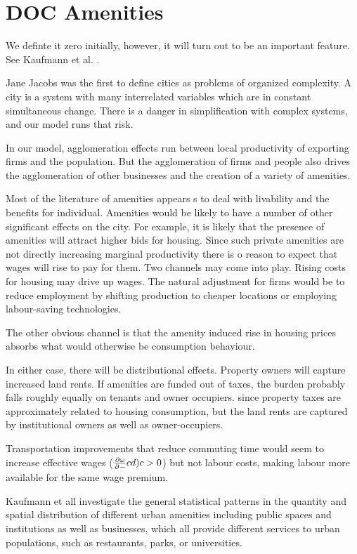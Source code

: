 \section{DOC Amenities}
We definte it zero initially, however, it will turn out to be an important feature. See Kaufmann et al. \cite{kaufmannScalingUrbanAmenities2022}.


Jane Jacobs was the first to define cities as problems of organized complexity. A city is a system with many interrelated variables which are  in constant simultaneous change. 
There is a danger in simplification with complex systems, and our model runs that risk. 

In our model, agglomeration effects run between local productivity  of exporting firms and the population. But the agglomeration of firms and people also drives the agglomeration of other businesses and the creation of a variety of amenities.

Most of the literature of amenities appears s to deal with livability  and the benefits for individual. Amenities would be likely to have a number of other significant effects on the city. For example, it is likely that the presence of amenities will attract higher bids for housing. Since such private amenities are not directly increasing marginal productivity there is o reason to expect that wages will rise to pay for them. Two channels may come into play. Rising costs for housing may drive up wages. The natural adjustment for firms would be to reduce employment by shifting production to cheaper locations or  employing labour-saving technologies.

The other obvious channel is that the amenity induced rise in housing prices absorbs what would otherwise be consumption behaviour.

In either case, there will be distributional effects. Property owners will capture increased land rents. If amenities are funded out of taxes, the burden probably falls roughly equally on tenants and owner occupiers. since property taxes are approximately related to housing consumption, but the land rents are captured by institutional owners as well as owner-occupiers.

Transportation improvements that reduce commuting time would seem to increase effective wages ($\frac{\partial \omega}{\partial -}cd){c}>0$) but not labour costs, making labour more available for the same wage premium. 

Kaufmann et all investigate the  general statistical patterns in the quantity and spatial distribution of different urban amenities including public spaces and institutions as well as businesses, which all provide different services to urban populations, such as  restaurants, parks, or universities. 

